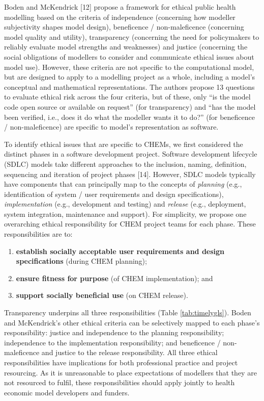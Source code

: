 \documentclass[
]{article}
\begin{document}
Boden and McKendrick {[}12{]} propose a framework for ethical public health modelling based on the criteria of independence (concerning how modeller subjectivity shapes model design), beneficence / non-maleficence (concerning model quality and utility), transparency (concerning the need for policymakers to reliably evaluate model strengths and weaknesses) and justice (concerning the social obligations of modellers to consider and communicate ethical issues about model use). However, these criteria are not specific to the computational model, but are designed to apply to a modelling project as a whole, including a model's conceptual and mathematical representations. The authors propose 13 questions to evaluate ethical risk across the four criteria, but of these, only ``is the model code open source or available on request'' (for transparency) and ``has the model been verified, i.e., does it do what the modeller wants it to do?'' (for beneficence / non-maleficence) are specific to model's representation as software.

To identify ethical issues that are specific to CHEMs, we first considered the distinct phases in a software development project. Software development lifecycle (SDLC) models take different approaches to the inclusion, naming, definition, sequencing and iteration of project phases {[}14{]}. However, SDLC models typically have components that can principally map to the concepts of \emph{planning} (e.g., identification of system / user requirements and design specifications), \emph{implementation} (e.g., development and testing) and \emph{release} (e.g., deployment, system integration, maintenance and support). For simplicity, we propose one overarching ethical responsibility for CHEM project teams for each phase. These responsibilities are to:

\begin{enumerate}
\def\labelenumi{(\roman{enumi})}
\item
  \textbf{establish socially acceptable user requirements and design specifications} (during CHEM planning);
\item
  \textbf{ensure fitness for purpose} (of CHEM implementation); and
\item
  \textbf{support socially beneficial use} (on CHEM release).
\end{enumerate}

Transparency underpins all three responsibilities (Table \ref{tab:timelygls}). Boden and McKendrick's other ethical criteria can be selectively mapped to each phase's responsibility: justice and independence to the planning responsibility; independence to the implementation responsibility; and beneficence / non-maleficence and justice to the release responsibility. All three ethical responsibilities have implications for both professional practice and project resourcing. As it is unreasonable to place expectations of modellers that they are not resourced to fulfil, these responsibilities should apply jointly to health economic model developers and funders.
\end{document}
